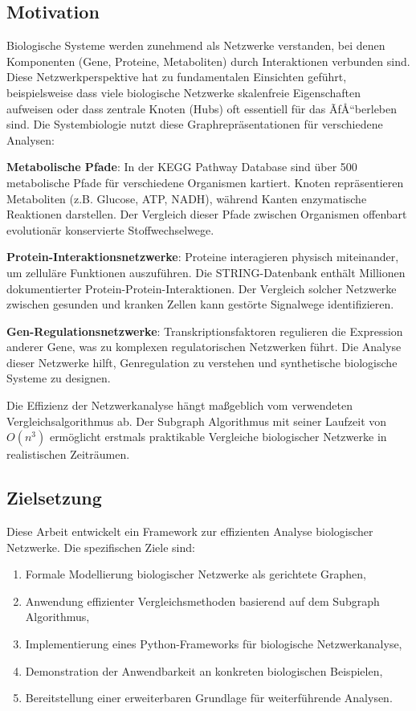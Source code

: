 ﻿\documentclass[a4paper,12pt]{article}
\theoremstyle{definition}
\begin{document}
\subsection{Motivation}

Biologische Systeme werden zunehmend als Netzwerke verstanden, bei denen Komponenten (Gene, Proteine, Metaboliten) durch Interaktionen verbunden sind. Diese Netzwerkperspektive hat zu fundamentalen Einsichten geführt, beispielsweise dass viele biologische Netzwerke skalenfreie Eigenschaften aufweisen oder dass zentrale Knoten (Hubs) oft essentiell für das ÃƒÅ“berleben sind. Die Systembiologie nutzt diese Graphrepräsentationen für verschiedene Analysen:

\textbf{Metabolische Pfade}: In der KEGG Pathway Database sind über 500 metabolische Pfade für verschiedene Organismen kartiert. Knoten repräsentieren Metaboliten (z.B. Glucose, ATP, NADH), während Kanten enzymatische Reaktionen darstellen. Der Vergleich dieser Pfade zwischen Organismen offenbart evolutionär konservierte Stoffwechselwege.

\textbf{Protein-Interaktionsnetzwerke}: Proteine interagieren physisch miteinander, um zelluläre Funktionen auszuführen. Die STRING-Datenbank enthält Millionen dokumentierter Protein-Protein-Interaktionen. Der Vergleich solcher Netzwerke zwischen gesunden und kranken Zellen kann gestörte Signalwege identifizieren.

\textbf{Gen-Regulationsnetzwerke}: Transkriptionsfaktoren regulieren die Expression anderer Gene, was zu komplexen regulatorischen Netzwerken führt. Die Analyse dieser Netzwerke hilft, Genregulation zu verstehen und synthetische biologische Systeme zu designen.

Die Effizienz der Netzwerkanalyse hängt maßgeblich vom verwendeten Vergleichsalgorithmus ab. Der Subgraph Algorithmus mit seiner Laufzeit von $O(n^3)$ ermöglicht erstmals praktikable Vergleiche biologischer Netzwerke in realistischen Zeiträumen.

\subsection{Zielsetzung}

Diese Arbeit entwickelt ein Framework zur effizienten Analyse biologischer Netzwerke. Die spezifischen Ziele sind:

\begin{enumerate}
	\item Formale Modellierung biologischer Netzwerke als gerichtete Graphen,
	\item Anwendung effizienter Vergleichsmethoden basierend auf dem Subgraph Algorithmus,
	\item Implementierung eines Python-Frameworks für biologische Netzwerkanalyse,
	\item Demonstration der Anwendbarkeit an konkreten biologischen Beispielen,
	\item Bereitstellung einer erweiterbaren Grundlage für weiterführende Analysen.
\end{enumerate}
\end{document}
